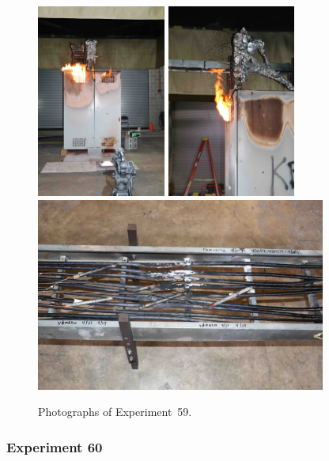 \begin{figure}[p]
\centering
\includegraphics[height=2.50in,angle=-90]{../FIGURES/Test_59_25_min_55_s}
\includegraphics[height=2.50in,angle=-90]{../FIGURES/Test_59_side} \\
\includegraphics[height=2.50in]{../FIGURES/Test_59_scar}
\caption[Photographs of Experiment~59]{Photographs of Experiment~59.}
\label{fig:Test_59_photos}
\end{figure}


\clearpage

\subsubsection{Experiment 60}

